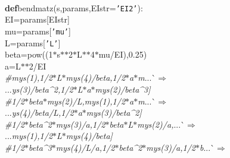 {{\begin{tabbing}
\\
{\textbf{def}}\hspace{5pt}bendmatz(s,params,EIstr={\texttt{{'}EI2{'}}}):
\\
\hspace{20pt}EI=params{[}EIstr{]}
\\
\hspace{20pt}mu=params{[}{\texttt{{'}mu{'}}}{]}
\\
\hspace{20pt}L=params{[}{\texttt{{'}L{'}}}{]}
\\
\hspace{20pt}beta=pow((\dash{}1$\ast$s$\ast$$\ast$2$\ast$L$\ast$$\ast$4$\ast$mu/EI),0.25)
\\
\hspace{20pt}a=L$\ast$$\ast$2/EI
\\
{\it{\#\hspace{20pt}{[}\hspace{85pt}mys(1),\hspace{30pt}1/2$\ast$L$\ast$mys(4)/beta,\hspace{15pt}\dash{}1/2$\ast$a$\ast$m}}{}...\`$\Rightarrow$\\
...{}{\it{ys(3)/beta\^{}2,\hspace{5pt}\dash{}1/2$\ast$L$\ast$a$\ast$mys(2)/beta\^{}3{]}
}}\\
{\it{\#\hspace{20pt}{[}\hspace{30pt}1/2$\ast$beta$\ast$mys(2)/L,\hspace{85pt}mys(1),\hspace{20pt}1/2$\ast$a$\ast$m}}{}...\`$\Rightarrow$\\
...{}{\it{ys(4)/beta/L,\hspace{20pt}1/2$\ast$a$\ast$mys(3)/beta\^{}2{]}
}}\\
{\it{\#\hspace{20pt}{[}\hspace{15pt}\dash{}1/2$\ast$beta\^{}2$\ast$mys(3)/a,\hspace{20pt}1/2$\ast$beta$\ast$L$\ast$mys(2)/a,\hspace{55pt}}}{}...\`$\Rightarrow$\\
...{}{\it{\hspace{30pt}mys(1),\hspace{25pt}\dash{}1/2$\ast$L$\ast$mys(4)/beta{]}
}}\\
{\it{\#\hspace{20pt}{[}\hspace{5pt}\dash{}1/2$\ast$beta\^{}3$\ast$mys(4)/L/a,\hspace{20pt}1/2$\ast$beta\^{}2$\ast$mys(3)/a,\hspace{25pt}\dash{}1/2$\ast$b}}{}...\`$\Rightarrow$\\
$$
\end{tabbing}}}
